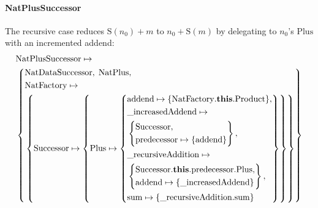 \paragraph{NatPlusSuccessor}
The recursive case reduces $\mathrm{S}(n_0) + m$ to $n_0 + \mathrm{S}(m)$
by delegating to $n_0$'s $\mathrm{Plus}$ with an incremented addend:
\[
  \begin{aligned}
    &\mathrm{NatPlusSuccessor} \mapsto \\
    &\left\{
    \begin{aligned}
      &\mathrm{NatDataSuccessor},\; \mathrm{NatPlus},\\
      &\mathrm{NatFactory} \mapsto \\
      &\left\{\mathrm{Successor} \mapsto \left\{\mathrm{Plus} \mapsto \left\{
              \begin{aligned}
                &\mathrm{addend} \mapsto \{\mathrm{NatFactory}.\mathbf{this}.\mathrm{Product}\},\\
                &\mathrm{\_increasedAddend} \mapsto  \\
                &\left\{
                  \begin{aligned}
                    &\mathrm{Successor},\\
                    &\mathrm{predecessor} \mapsto \{\mathrm{addend}\}
                \end{aligned}\right\},\\
                &\mathrm{\_recursiveAddition} \mapsto \\
                &\left\{
                  \begin{aligned}
                    &\mathrm{Successor}.\mathbf{this}.\mathrm{predecessor}.\mathrm{Plus},\\
                    &\mathrm{addend} \mapsto \{\mathrm{\_increasedAddend}\}
                \end{aligned}\right\},\\
                &\mathrm{sum} \mapsto \{\mathrm{\_recursiveAddition}.\mathrm{sum}\}
          \end{aligned}\right\}\right\}\right\}
  \end{aligned}\right\}
  \end{aligned}
\]

